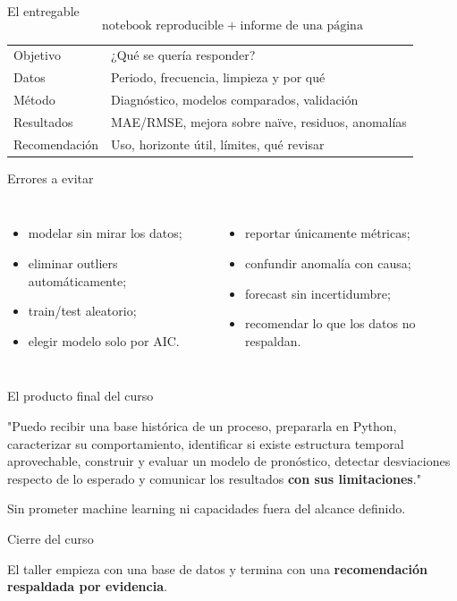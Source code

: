 \begin{frame}{El entregable}
\[
\boxed{\text{notebook reproducible} \;+\; \text{informe de una página}}
\]
\begin{center}
\begin{tabular}{ll}
\toprule
Objetivo & ¿Qué se quería responder?\\
Datos & Periodo, frecuencia, limpieza y por qué\\
Método & Diagnóstico, modelos comparados, validación\\
Resultados & MAE/RMSE, mejora sobre naïve, residuos, anomalías\\
Recomendación & Uso, horizonte útil, límites, qué revisar\\
\bottomrule
\end{tabular}
\end{center}
\end{frame}

\begin{frame}{Errores a evitar}
\begin{columns}[T]
\begin{itemize}
  \item modelar sin mirar los datos;
  \item eliminar outliers automáticamente;
  \item train/test aleatorio;
  \item elegir modelo solo por AIC.
\end{itemize}
\begin{itemize}
  \item reportar únicamente métricas;
  \item confundir anomalía con causa;
  \item forecast sin incertidumbre;
  \item recomendar lo que los datos no respaldan.
\end{itemize}
\end{columns}
\end{frame}

\begin{frame}{El producto final del curso}
\begin{recordar}
"Puedo recibir una base histórica de un proceso, prepararla en Python, caracterizar su
comportamiento, identificar si existe estructura temporal aprovechable, construir y
evaluar un modelo de pronóstico, detectar desviaciones respecto de lo esperado y
comunicar los resultados \textbf{con sus limitaciones}."
\end{recordar}
\vfill
Sin prometer machine learning ni capacidades fuera del alcance definido.
\end{frame}

\begin{frame}{Cierre del curso}

\vfill
El taller empieza con una base de datos y termina con una
\textbf{recomendación respaldada por evidencia}.
\end{frame}


